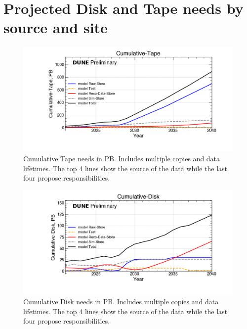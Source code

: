 \section{Projected Disk and Tape needs by source and site}
\begin{figure}[h]
\centering\includegraphics[height=0.4\textwidth]{DOE23-NDLAr_2023-06-23-2040/DOE23-NDLAr_2023-06-23-2040-Cumulative-Tape.png}
\caption{Cumulative Tape needs in PB. Includes multiple copies and data lifetimes. The top 4 lines show the source of the data while the last four propose responsibilities.}
\label{fig:Cumulative-Tape}
\end{figure}
\begin{figure}[h]
\centering\includegraphics[height=0.4\textwidth]{DOE23-NDLAr_2023-06-23-2040/DOE23-NDLAr_2023-06-23-2040-Cumulative-Disk.png}
\caption{Cumulative Disk needs in PB. Includes multiple copies and data lifetimes. The top 4 lines show the source of the data while the last four propose responsibilities.}
\label{fig:Cumulative-Disk}
\end{figure}
